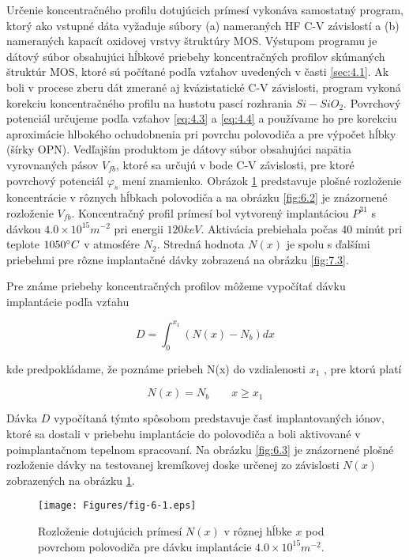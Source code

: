 Určenie koncentračného profilu dotujúcich prímesí vykonáva samostatný
program, ktorý ako vstupné dáta vyžaduje súbory (a) nameraných HF C-V
závislostí a (b) nameraných kapacít oxidovej vrstvy štruktúry
MOS. Výstupom programu je dátový súbor obsahujúci hĺbkové priebehy
koncentračných profilov skúmaných štruktúr MOS, ktoré sú počítané
podľa vzťahov uvedených v časti \ref{sec:4.1}. Ak boli v procese zberu
dát zmerané aj kvázistatické C-V závislosti, program vykoná korekciu
koncentračného profilu na hustotu pascí rozhrania
$Si-SiO_2$. Povrchový potenciál určujeme podľa vzťahov \ref{eq:4.3} a
\ref{eq:4.4} a používame ho pre korekciu aproximácie hlbokého
ochudobnenia pri povrchu polovodiča a pre výpočet hĺbky (šírky
OPN). Vedľajším produktom je dátovy súbor obsahujúci napätia
vyrovnaných pásov $V_{fb}$, ktoré sa určujú v bode C-V závislosti, pre
ktoré povrchový potenciál $\varphi_s$ mení znamienko. Obrázok
\ref{fig:6.1} predstavuje plošné rozloženie koncentrácie v rôznych
hĺbkach polovodiča a na obrázku \ref{fig:6.2} je znázornené rozloženie
$V_{fb}$. Koncentračný profil prímesí bol vytvorený implantáciou
$P^{31}$ s dávkou $4.0\times 10^{15} m^{-2}$ pri energii $120
keV$. Aktivácia prebiehala počas 40 minút pri teplote $1050 \degree C$
v atmosfére $N_2$. Stredná hodnota $N(x)$ je spolu s ďalšími priebehmi
pre rôzne implantačné dávky zobrazená na obrázku \ref{fig:7.3}.

Pre známe priebehy koncentračných profilov môžeme vypočítať dávku
implantácie podľa vzťahu

\begin{equation}\label{eq:6.1}
D = \int_{0}^{x_{1}}(N(x) - N_{b}) dx
\end{equation}

kde predpokládame, že poznáme priebeh N(x) do vzdialenosti $x_{1}$ ,
pre ktorú platí

\begin{equation}\label{eq:6.2}
N(x) = N_{b} \qquad {x \ge x_{1}}
\end{equation}

Dávka $D$ vypočítaná týmto spôsobom predstavuje časť implantovaných
iónov, ktoré sa dostali v priebehu implantácie do polovodiča a boli
aktivované v poimplantačnom tepelnom spracovaní. Na obrázku
\ref{fig:6.3} je znázornené plošné rozloženie dávky na testovanej
kremíkovej doske určenej zo závislosti $N(x)$ zobrazených na obrázku
\ref{fig:6.1}.

\begin{figure}[h!]\centering
\texttt{[image: Figures/fig-6-1.eps]}
\captionsetup{justification=raggedright, singlelinecheck=false}
\caption[Rozloženie dotujúcich prímesí $N(x)$ v rôznej hĺbke
  $x$]{Rozloženie dotujúcich prímesí $N(x)$ v rôznej hĺbke $x$ pod
  povrchom polovodiča pre dávku implantácie $4.0 \times 10^{15}
  m^{-2}$.}
\label{fig:6.1}
\end{figure}

